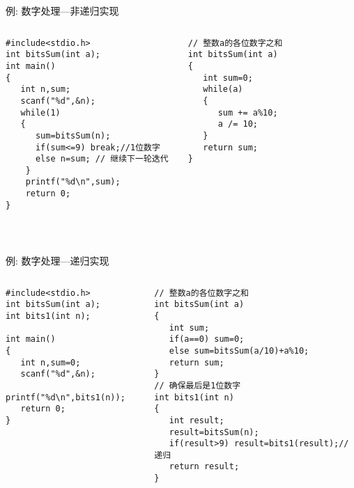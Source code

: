 \begin{frame}{例: 数字处理---非递归实现}
\vspace{-0.3cm}
\begin{columns}[T]
\begin{lstlisting}
#include<stdio.h>
int bitsSum(int a);
int main()
{
   int n,sum;
   scanf("%d",&n);
   while(1)
   {
      sum=bitsSum(n);
      if(sum<=9) break;//1位数字
      else n=sum; // 继续下一轮迭代 
    }
    printf("%d\n",sum); 
    return 0;
}
\end{lstlisting}
\begin{lstlisting}[frame=leftline]
// 整数a的各位数字之和
int bitsSum(int a)
{
   int sum=0;
   while(a)
   {
      sum += a%10;
      a /= 10;
   }
   return sum;
}
\end{lstlisting}
\end{columns}
~\\
\end{frame}

\begin{frame}{例: 数字处理---递归实现}
\vspace{-0.3cm}
\begin{columns}[T]
\begin{lstlisting}
#include<stdio.h>
int bitsSum(int a);
int bits1(int n);

int main()
{
   int n,sum=0;
   scanf("%d",&n);
   printf("%d\n",bits1(n)); 
   return 0;
} 
\end{lstlisting}
\begin{lstlisting}[frame=leftline]
// 整数a的各位数字之和
int bitsSum(int a)
{
   int sum;
   if(a==0) sum=0;  
   else sum=bitsSum(a/10)+a%10;
   return sum;
}
// 确保最后是1位数字
int bits1(int n)
{
   int result;
   result=bitsSum(n);
   if(result>9) result=bits1(result);//递归
   return result; 
}
\end{lstlisting}
\end{columns}
~\\
\end{frame}

